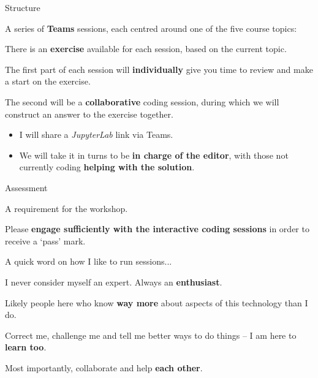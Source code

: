 \documentclass[10pt, dvipsnames, table, aspectratio=169]{beamer}
\begin{document}
\begin{frame}{Structure}

A series of \textbf{Teams} sessions, each centred around one of the five course topics:

\begin{centering}

\begin{table}[h!]

    \centering

    

\end{table}

\end{centering}

\framebreak

There is an \textbf{exercise} available for each session, based on the current topic.

The first part of each session will \textbf{individually} give you time to review and make a start on the exercise.

The second will be a \textbf{collaborative} coding session, during which we will construct an answer to the exercise together.

\begin{itemize}

  \item I will share a \emph{JupyterLab} link via Teams.

  \item We will take it in turns to be \textbf{in charge of the editor}, with those not currently coding \textbf{helping with the solution}.

\end{itemize}

\end{frame}


\begin{frame}[fragile]{Assessment}

A requirement for the workshop.

Please \textbf{engage sufficiently with the interactive coding sessions} in order to receive a `pass' mark.

\end{frame}


\begin{frame}[fragile]{A quick word on how I like to run sessions...}

I never consider myself an expert. Always an \textbf{enthusiast}.

Likely people here who know \textbf{way more} about aspects of this technology than I do.

Correct me, challenge me and tell me better ways to do things -- I am here to \textbf{learn too}.

Most importantly, collaborate and help \textbf{each other}.

\end{frame}
\end{document}
